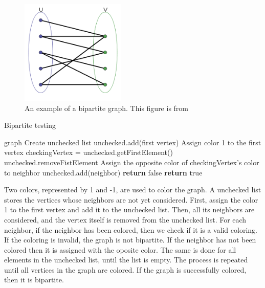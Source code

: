 \documentclass[a4paper]{report}
\begin{document}
			\begin{figure}[h]
				\centering
				\includegraphics[width=50mm,scale=0.5]{figures/bipartite.png}
				\caption{An example of a bipartite graph. This figure is from \protect\cite{bipartiteFig}}
				\label{fig:bipartite}
			\end{figure}
			
			\begin{algorithm}
				\caption{Bipartite testing}
				\label{alg:bipartite}
			
				\begin{algorithmic}
					\REQUIRE graph
					\STATE Create unchecked list
					\STATE unchecked.add(first vertex)
					\STATE Assign color 1 to the first vertex
					\STATE checkingVertex = unchecked.getFirstElement()
					\STATE unchecked.removeFistElement
					\STATE Assign the opposite color of checkingVertex's color to neighbor
					\STATE unchecked.add(neighbor)
					\STATE \textbf{return} false
					\ENDIF
					\ENDFOR
					\ENDWHILE
					\ENDWHILE
					\STATE \textbf{return} true
				\end{algorithmic}
			\end{algorithm}
			 Two colors, represented by 1 and -1, are used to color the graph. A unchecked list stores the vertices whose neighbors are not yet considered. First, assign the color 1 to the first vertex and add it to the unchecked list. Then, all its neighbors are considered, and the vertex itself is removed from the unchecked list. For each neighbor, if the neighbor has been colored, then we check if it is a valid coloring. If the coloring is invalid, the graph is not bipartite. If the neighbor has not been colored then it is assigned with the oposite color. The same is done for all elements in the unchecked list, until the list is empty. The process is repeated until all vertices in the graph are colored. If the graph is successfully colored, then it is bipartite.
\end{document}
